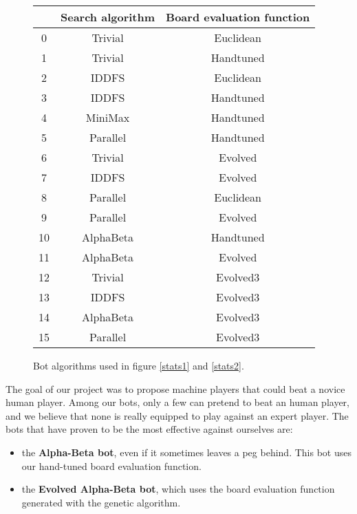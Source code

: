 \begin{figure}
\centering
\begin{tabular}{|c | c c |}
\hline
  & Search algorithm & Board evaluation function \\
 \hline
0 & Trivial & Euclidean \\
1 & Trivial & Handtuned \\
2 & IDDFS & Euclidean \\
3 & IDDFS & Handtuned \\
4 & MiniMax & Handtuned \\
5 & Parallel & Handtuned \\
6 & Trivial & Evolved \\
7 & IDDFS & Evolved \\
8 & Parallel & Euclidean \\
9 & Parallel & Evolved \\
10 & AlphaBeta & Handtuned \\
11 & AlphaBeta & Evolved \\
12 & Trivial & Evolved3 \\
13 & IDDFS & Evolved3 \\
14 & AlphaBeta & Evolved3 \\
15 & Parallel & Evolved3 \\
\hline
\end{tabular}
\caption{Bot algorithms used in figure \ref{stats1} and \ref{stats2}.}
\label{botid}
\end{figure}




The goal of our project was to propose machine players that could beat
a novice human player. Among our bots, only a few can pretend to beat
an human player, and we believe that none is really equipped to play
against an expert player. The bots that have proven to be the most
effective against ourselves are:

\begin{itemize}
  \item the \textbf{Alpha-Beta bot}, even if it sometimes leaves a peg behind.
        This bot uses our hand-tuned board evaluation function.
  \item the \textbf{Evolved Alpha-Beta bot}, which uses the board evaluation
        function generated with the genetic algorithm.
\end{itemize}

